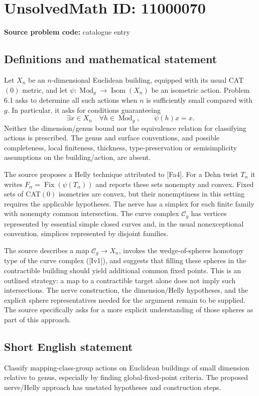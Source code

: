 \documentclass[11pt]{article}
\begin{document}
\section*{UnsolvedMath ID: 11000070}
\textbf{Source problem code:} catalogue entry
\subsection{Definitions and mathematical statement}
Let $X_n$ be an $n$-dimensional Euclidean building, equipped with its usual CAT$(0)$ metric, and let $\psi:\operatorname{Mod}_g\to\operatorname{Isom}(X_n)$ be an isometric action. Problem 6.1 asks to determine all such actions when $n$ is sufficiently small compared with $g$. In particular, it asks for conditions guaranteeing
\[
 \exists x\in X_n\quad\forall h\in\operatorname{Mod}_g,
 \qquad \psi(h)x=x.
\]
Neither the dimension/genus bound nor the equivalence relation for classifying actions is prescribed. The genus and surface conventions, and possible completeness, local finiteness, thickness, type-preservation or semisimplicity assumptions on the building/action, are absent.

The source proposes a Helly technique attributed to [Fa4]. For a Dehn twist $T_\alpha$ it writes $F_\alpha=\operatorname{Fix}(\psi(T_\alpha))$ and reports these sets nonempty and convex. Fixed sets of CAT$(0)$ isometries are convex, but their nonemptiness in this setting requires the applicable hypotheses. The nerve has a simplex for each finite family with nonempty common intersection. The curve complex $\mathcal C_g$ has vertices represented by essential simple closed curves and, in the usual nonexceptional convention, simplices represented by disjoint families.

The source describes a map $\mathcal C_g\to X_n$, invokes the wedge-of-spheres homotopy type of the curve complex ([Iv1]), and suggests that filling these spheres in the contractible building should yield additional common fixed points. This is an outlined strategy: a map to a contractible target alone does not imply such intersections. The nerve construction, the dimension/Helly hypotheses, and the explicit sphere representatives needed for the argument remain to be supplied. The source specifically asks for a more explicit understanding of those spheres as part of this approach.
\subsection{Short English statement}
Classify mapping-class-group actions on Euclidean buildings of small dimension relative to genus, especially by finding global-fixed-point criteria. The proposed nerve/Helly approach has unstated hypotheses and construction steps.
\end{document}
